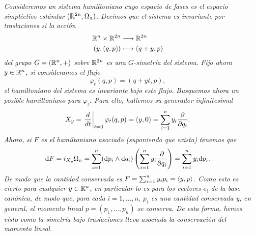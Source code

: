 \begin{ejemplo}
  \em
  Consideremos un sistema hamiltoniano cuyo espacio de fases es el espacio simpléctico estándar $(\mathbb{R}^{2n},\Omega_n)$. Decimos que el sistema es \emph{invariante por traslaciones} si la acción
  \begin{align*}
    \mathbb{R}^n\times \mathbb{R}^{2n}&\longrightarrow \mathbb{R}^{2n}\\ 
      (y,(q,p)) &\longmapsto (q+y,p) 
    \end{align*}
del grupo $G=(\mathbb{R}^n,+)$ sobre $\mathbb{R}^{2n}$ es una $G$-simetría del sistema. Fijo ahora $y\in \mathbb{R}^n$, si consideramos el flujo
\begin{equation*}
  \varphi_t(q,p)=(q+yt,p),
\end{equation*}
el hamiltoniano del sistema es invariante bajo este flujo. Busquemos ahora un posible hamiltoniano para $\varphi_t$. Para ello, hallemos su generador infinitesimal
\begin{equation*}
  X_y=\left.\frac{d}{dt}\right|_{t=0}\varphi_t(q,p)=(y,0)=\sum_{i=1}^n y_i \frac{\partial}{\partial q_i}.
\end{equation*}
Ahora, si $F$ es el hamiltoniano asociado (suponiendo que exista) tenemos que
\begin{equation*}
  \mathrm{d} F=i_{X_y}\Omega_n=\sum_{i=1}^n(\mathrm{d} p_i \wedge \mathrm{d} q_i)\left(\sum_{i=1}^n y_i\frac{\partial}{\partial q_i} \right)=\sum_{i=1}^n y_i \mathrm{d} p_i.
\end{equation*}
De modo que la cantidad conservada es $F=\sum_{i=1}^n y_i p_i=\left\langle y,p\right\rangle$. Como esto es cierto para cualquier $y\in \mathbb{R}^n$, en particular lo es para los vectores $e_i$ de la base canónica, de modo que, para cada $i=1,\dots,n$, $p_i$ es una cantidad conservada y, en general, el \emph{momento lineal} $p=(p_1,\dots,p_n)$ se conserva. De esta forma, hemos visto como la simetría bajo traslaciones lleva asociada la conservación del momento lineal.
\end{ejemplo}

